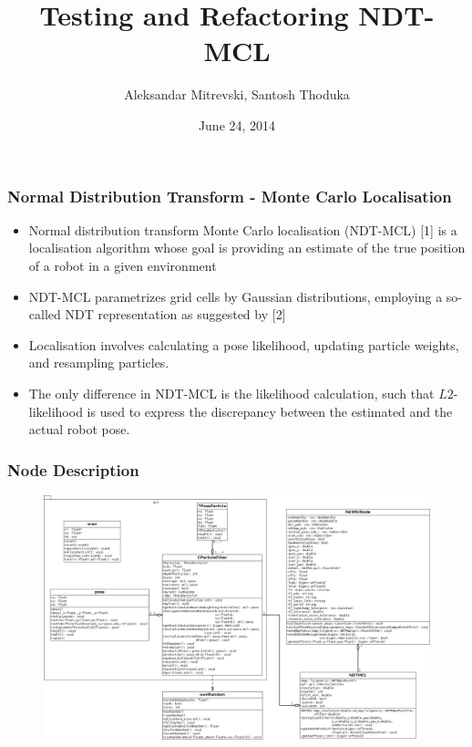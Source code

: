 \documentclass{beamer}
\title[Testing and Refactoring NDT-MCL]{Testing and Refactoring NDT-MCL} %
\author{Aleksandar Mitrevski, Santosh Thoduka} %
\institute[BRSU] %
{
Hochschule Bonn Rhein Sieg \\ %
\medskip
\textit{aleksandar.mitrevski@smail.inf.h-brs.de\\santosh.thoduka@smail.inf.h-brs.de} 
}
\date{June 24, 2014} %
\begin{document}

\begin{frame}
\titlepage %
\end{frame}


\begin{frame}
\frametitle{Normal Distribution Transform - Monte Carlo Localisation}
\begin{itemize}
\item Normal distribution transform Monte Carlo localisation (NDT-MCL) [1] is a localisation algorithm whose goal is providing an estimate of the true position of a robot in a given environment
\item NDT-MCL parametrizes grid cells by Gaussian distributions, employing a so-called NDT representation as suggested by [2]
\item Localisation involves calculating a pose likelihood, updating particle weights, and resampling particles. 
\item The only difference in NDT-MCL is the likelihood calculation, such that $L2$-likelihood is used to express the discrepancy between the estimated and the actual robot pose.
\end{itemize}

\end{frame}

\begin{frame}
\frametitle{Node Description}
	\begin{figure}
    \includegraphics[height=0.7\textwidth]{ndtmcl.png}    
    \end{figure}
\end{frame}
\end{document}
